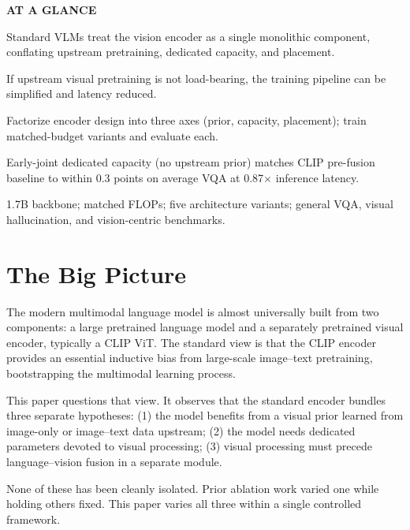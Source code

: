 \documentclass[10pt,twocolumn]{article}
\begin{document}
\begin{mdframed}[backgroundcolor=boxgray,linecolor=rulered,linewidth=1pt,
    innerleftmargin=6pt,innerrightmargin=6pt,
    innertopmargin=6pt,innerbottommargin=6pt]
\textbf{\small AT A GLANCE}\par\vspace{4pt}
\begin{description}[leftmargin=0pt,labelsep=4pt,itemsep=2pt,parsep=0pt,
    font=\small\bfseries]
  \item[Problem:] Standard VLMs treat the vision encoder as a single monolithic component, conflating upstream pretraining, dedicated capacity, and placement.
  \item[Why it matters:] If upstream visual pretraining is not load-bearing, the training pipeline can be simplified and latency reduced.
  \item[Method:] Factorize encoder design into three axes (prior, capacity, placement); train matched-budget variants and evaluate each.
  \item[Result:] Early-joint dedicated capacity (no upstream prior) matches CLIP pre-fusion baseline to within 0.3 points on average VQA at 0.87$\times$ inference latency.
  \item[Evidence:] 1.7B backbone; matched FLOPs; five architecture variants; general VQA, visual hallucination, and vision-centric benchmarks.
\end{description}
\end{mdframed}

\section{The Big Picture}

The modern multimodal language model is almost universally built from two components: a large pretrained language model and a separately pretrained visual encoder, typically a CLIP ViT.
The standard view is that the CLIP encoder provides an essential inductive bias from large-scale image--text pretraining, bootstrapping the multimodal learning process.

This paper questions that view.
It observes that the standard encoder bundles three separate hypotheses:
(1) the model benefits from a visual prior learned from image-only or image--text data upstream;
(2) the model needs dedicated parameters devoted to visual processing;
(3) visual processing must precede language--vision fusion in a separate module.

None of these has been cleanly isolated.
Prior ablation work varied one while holding others fixed.
This paper varies all three within a single controlled framework.
\end{document}
